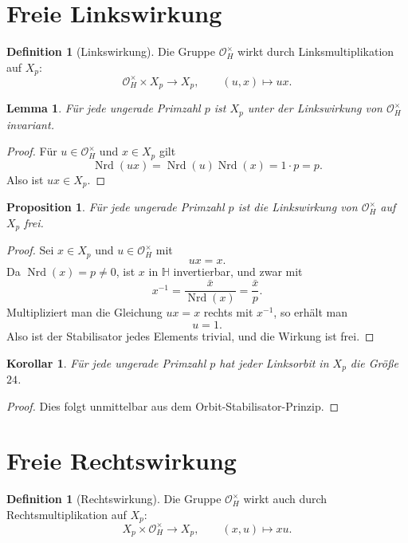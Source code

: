 \documentclass[12pt,a4paper]{article}
\theoremstyle{plain}
\newtheorem{lemma}[satz]{Lemma}
\newtheorem{proposition}[satz]{Proposition}
\newtheorem{korollar}[satz]{Korollar}
\theoremstyle{definition}
\newtheorem{definition}[satz]{Definition}
\theoremstyle{remark}
\newcommand{\OH}{\mathcal O_H}
\newcommand{\QH}{\mathbb H}
\newcommand{\nrd}{\operatorname{Nrd}}
\begin{document}
	\section{Freie Linkswirkung}
	
	\begin{definition}[Linkswirkung]
		Die Gruppe \(\OH^\times\) wirkt durch Linksmultiplikation auf \(X_p\):
		\[
		\OH^\times\times X_p\to X_p,\qquad (u,x)\mapsto ux.
		\]
	\end{definition}
	
	\begin{lemma}
		Für jede ungerade Primzahl \(p\) ist \(X_p\) unter der Linkswirkung von \(\OH^\times\) invariant.
	\end{lemma}
	
	\begin{proof}
		Für \(u\in\OH^\times\) und \(x\in X_p\) gilt
		\[
		\nrd(ux)=\nrd(u)\nrd(x)=1\cdot p=p.
		\]
		Also ist \(ux\in X_p\).
	\end{proof}
	
	\begin{proposition}
		Für jede ungerade Primzahl \(p\) ist die Linkswirkung von \(\OH^\times\) auf \(X_p\) frei.
	\end{proposition}
	
	\begin{proof}
		Sei \(x\in X_p\) und \(u\in\OH^\times\) mit
		\[
		ux=x.
		\]
		Da \(\nrd(x)=p\neq 0\), ist \(x\) in \(\QH\) invertierbar, und zwar mit
		\[
		x^{-1}=\frac{\bar x}{\nrd(x)}=\frac{\bar x}{p}.
		\]
		Multipliziert man die Gleichung \(ux=x\) rechts mit \(x^{-1}\), so erhält man
		\[
		u=1.
		\]
		Also ist der Stabilisator jedes Elements trivial, und die Wirkung ist frei.
	\end{proof}
	
	\begin{korollar}
		Für jede ungerade Primzahl \(p\) hat jeder Linksorbit in \(X_p\) die Größe \(24\).
	\end{korollar}
	
	\begin{proof}
		Dies folgt unmittelbar aus dem Orbit-Stabilisator-Prinzip.
	\end{proof}
	
	\section{Freie Rechtswirkung}
	
	\begin{definition}[Rechtswirkung]
		Die Gruppe \(\OH^\times\) wirkt auch durch Rechtsmultiplikation auf \(X_p\):
		\[
		X_p\times\OH^\times\to X_p,\qquad (x,u)\mapsto xu.
		\]
	\end{definition}
	
\end{document}
